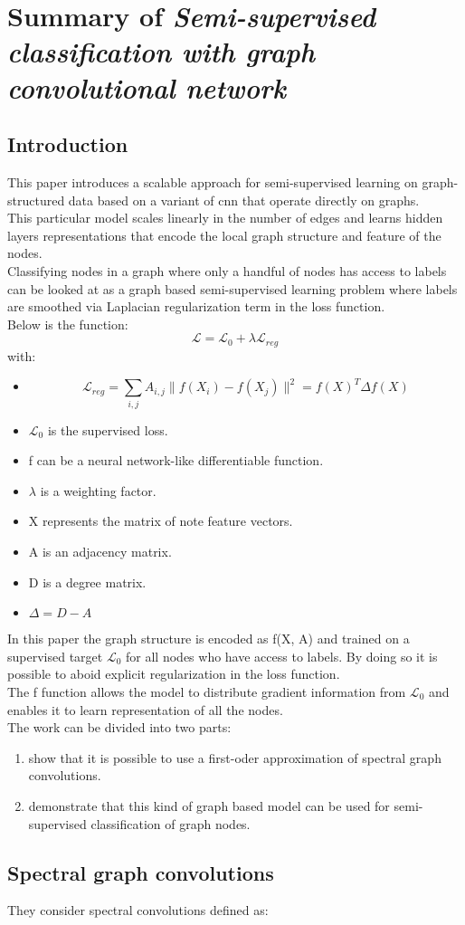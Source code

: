 \section*{Summary of \textit{Semi-supervised classification with graph convolutional network}}
\subsection*{Introduction}
This paper introduces a scalable approach for semi-supervised learning on graph-structured data based on a variant of cnn that operate directly on graphs.\\
This particular model scales linearly in the number of edges and learns hidden layers representations that encode the local graph structure and feature of the nodes.\\
Classifying nodes in a graph where only a handful of nodes has access to labels can be looked at as a graph based semi-supervised learning problem where labels are smoothed via Laplacian regularization term in the loss function.\\
Below is the function:
\begin{equation*}
	\mathcal{L} = \mathcal{L}_0 + \lambda\mathcal{L}_{reg}
\end{equation*}
with:
\begin{itemize}
	\item \begin{equation*}\mathcal{L}_{reg} = \sum_{i,j} A_{i,j} \lVert f(X_i)-f(X_j) \rVert^2 = f(X)^T\Delta f(X)\end{equation*}
	\item $\mathcal{L}_0$ is the supervised loss.
	\item f can be a neural network-like differentiable function.
	\item $\lambda$ is a weighting factor.
	\item X represents the matrix of note feature vectors.
	\item A is an adjacency matrix.
	\item D is a degree matrix.
	\item $\Delta = D - A $ 
\end{itemize}
In this paper the graph structure is encoded as f(X, A) and trained on a supervised target $\mathcal{L}_0$ for all nodes who have access to labels. By doing so it is possible to aboid explicit regularization in the loss function.\\
The f function allows the model to distribute gradient information from $\mathcal{L}_0$ and enables it to learn representation of all the nodes.\\
The work can be divided into two parts:
\begin{enumerate}
	\item show that it is possible to use a first-oder approximation of spectral graph convolutions.
	\item demonstrate that this kind of graph based model can be used for semi-supervised classification of graph nodes.
\end{enumerate}
\subsection*{Spectral graph convolutions}
They consider spectral convolutions defined as:
